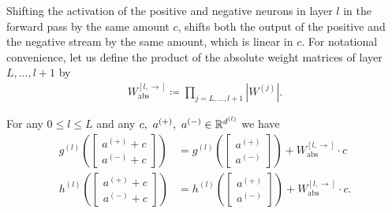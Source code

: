 Shifting the activation of the positive and negative neurons in layer $l$ in the forward pass by the same amount $c$, shifts both the output of the positive and the negative stream by the same amount, which is linear in $c$. For notational convenience, let us define the product of the absolute weight matrices of layer $L,\dots,l+1$ by
\begin{align}
    W_{\text{abs}}^{[l, \rightarrow]} \coloneqq \prod_{ j = L, \dots, l+1} \left|W^{(j)}\right|. \label{eq:w_abs}
\end{align}

\begin{theorem} \label{thm:shift_forward}
    For any $0 \leq l \leq L$ and any $c, \ a^{(+)}, \ a^{(-)} \in \mathbb{R} ^ {d^{(l)}}$ we have
    \begin{align}
        g^{(l)}\!\left( \begin{bmatrix} a^{(+)} + c \\ a^{(-)} + c \end{bmatrix} \right)
            &= g^{(l)}\!\left( \begin{bmatrix} a^{(+)} \\ a^{(-)} \end{bmatrix} \right)
            + W_{\text{abs}}^{[l, \rightarrow]} \cdot c \\
        h^{(l)}\!\left( \begin{bmatrix} a^{(+)} + c \\ a^{(-)} + c \end{bmatrix} \right)
            &= h^{(l)}\!\left( \begin{bmatrix} a^{(+)} \\ a^{(-)} \end{bmatrix} \right)
            + W_{\text{abs}}^{[l, \rightarrow]} \cdot c.
    \end{align}
\end{theorem}

